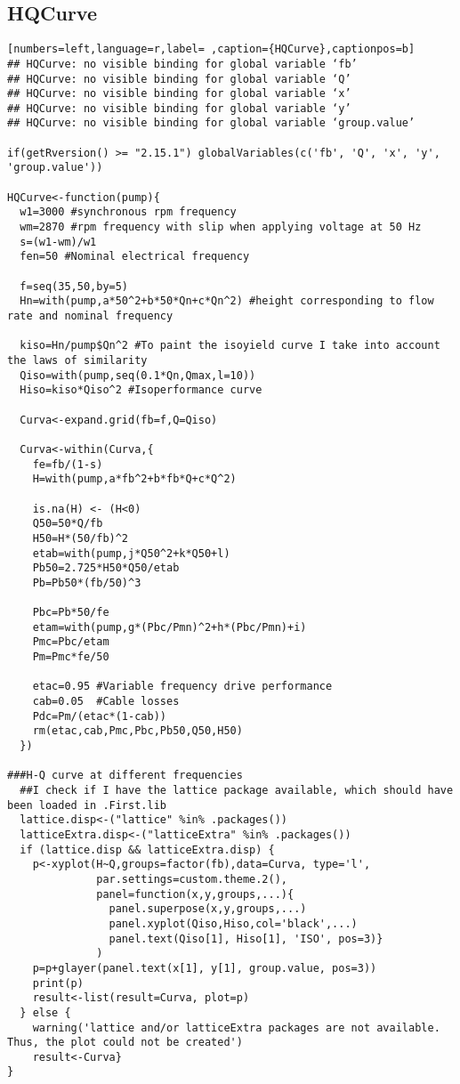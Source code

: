 \subsection{HQCurve}
\label{sec:org5093a7a}
\begin{lstlisting}[numbers=left,language=r,label= ,caption={HQCurve},captionpos=b]
## HQCurve: no visible binding for global variable ‘fb’
## HQCurve: no visible binding for global variable ‘Q’
## HQCurve: no visible binding for global variable ‘x’
## HQCurve: no visible binding for global variable ‘y’
## HQCurve: no visible binding for global variable ‘group.value’

if(getRversion() >= "2.15.1") globalVariables(c('fb', 'Q', 'x', 'y', 'group.value'))

HQCurve<-function(pump){
  w1=3000 #synchronous rpm frequency
  wm=2870 #rpm frequency with slip when applying voltage at 50 Hz
  s=(w1-wm)/w1
  fen=50 #Nominal electrical frequency

  f=seq(35,50,by=5)
  Hn=with(pump,a*50^2+b*50*Qn+c*Qn^2) #height corresponding to flow rate and nominal frequency

  kiso=Hn/pump$Qn^2 #To paint the isoyield curve I take into account the laws of similarity
  Qiso=with(pump,seq(0.1*Qn,Qmax,l=10))
  Hiso=kiso*Qiso^2 #Isoperformance curve

  Curva<-expand.grid(fb=f,Q=Qiso)

  Curva<-within(Curva,{
    fe=fb/(1-s)
    H=with(pump,a*fb^2+b*fb*Q+c*Q^2)

    is.na(H) <- (H<0)
    Q50=50*Q/fb
    H50=H*(50/fb)^2
    etab=with(pump,j*Q50^2+k*Q50+l)
    Pb50=2.725*H50*Q50/etab
    Pb=Pb50*(fb/50)^3

    Pbc=Pb*50/fe
    etam=with(pump,g*(Pbc/Pmn)^2+h*(Pbc/Pmn)+i)
    Pmc=Pbc/etam
    Pm=Pmc*fe/50

    etac=0.95 #Variable frequency drive performance
    cab=0.05  #Cable losses
    Pdc=Pm/(etac*(1-cab))
    rm(etac,cab,Pmc,Pbc,Pb50,Q50,H50)
  })

###H-Q curve at different frequencies
  ##I check if I have the lattice package available, which should have been loaded in .First.lib
  lattice.disp<-("lattice" %in% .packages())
  latticeExtra.disp<-("latticeExtra" %in% .packages())
  if (lattice.disp && latticeExtra.disp) {
    p<-xyplot(H~Q,groups=factor(fb),data=Curva, type='l',
              par.settings=custom.theme.2(),
              panel=function(x,y,groups,...){
                panel.superpose(x,y,groups,...)
                panel.xyplot(Qiso,Hiso,col='black',...)
                panel.text(Qiso[1], Hiso[1], 'ISO', pos=3)}
              )
    p=p+glayer(panel.text(x[1], y[1], group.value, pos=3))
    print(p)
    result<-list(result=Curva, plot=p)
  } else {
    warning('lattice and/or latticeExtra packages are not available. Thus, the plot could not be created')
    result<-Curva}
}
\end{lstlisting}
